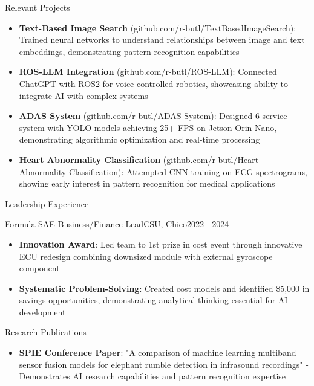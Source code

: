 \documentclass[]{mcdowellcv}
\begin{document}
\begin{cvsection}{Relevant Projects}
	\begin{cvsubsection}{}{}{}
		\begin{itemize}
			\setlength\itemsep{3pt}
			\item \textbf{Text-Based Image Search} (github.com/r-butl/TextBasedImageSearch): Trained neural networks to understand relationships between image and text embeddings, demonstrating pattern recognition capabilities
			\item \textbf{ROS-LLM Integration} (github.com/r-butl/ROS-LLM): Connected ChatGPT with ROS2 for voice-controlled robotics, showcasing ability to integrate AI with complex systems
			\item \textbf{ADAS System} (github.com/r-butl/ADAS-System): Designed 6-service system with YOLO models achieving 25+ FPS on Jetson Orin Nano, demonstrating algorithmic optimization and real-time processing
			\item \textbf{Heart Abnormality Classification} (github.com/r-butl/Heart-Abnormality-Classification): Attempted CNN training on ECG spectrograms, showing early interest in pattern recognition for medical applications
		\end{itemize}
	\end{cvsubsection}
\end{cvsection}

\begin{cvsection}{Leadership Experience}
	\begin{cvsubsection}{Formula SAE Business/Finance Lead}{CSU, Chico}{2022 | 2024}
		\begin{itemize}
			\item \textbf{Innovation Award}: Led team to 1st prize in cost event through innovative ECU redesign combining downsized module with external gyroscope component
			\item \textbf{Systematic Problem-Solving}: Created cost models and identified \$5,000 in savings opportunities, demonstrating analytical thinking essential for AI development
		\end{itemize}
	\end{cvsubsection}
\end{cvsection}

\begin{cvsection}{Research Publications}
	\begin{cvsubsection}{}{}{}
		\begin{itemize}
			\setlength\itemsep{3pt}
			\item \textbf{SPIE Conference Paper}: "A comparison of machine learning multiband sensor fusion models for elephant rumble detection in infrasound recordings" - Demonstrates AI research capabilities and pattern recognition expertise
		\end{itemize}
	\end{cvsubsection}
\end{cvsection}
\end{document}
